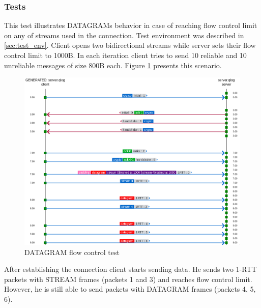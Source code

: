 \subsubsection{Tests}
This test illustrates DATAGRAMs behavior in case of reaching flow control limit on any of streams used in the connection.
Test environment was described in \ref{sec:test_env}.
Client opens two bidirectional streams while server sets their flow control limit to 1000B.
In each iteration client tries to send 10 reliable and 10 unreliable messages of size 800B each.
Figure \ref{fig:dgram_flow_control} presents this scenario.

\begin{figure}
  \centering
  \includegraphics[width=\textwidth]{img/__09__datagrams/dgram_flow_control.png}
  \caption{DATAGRAM flow control test}
  \label{fig:dgram_flow_control}
\end{figure}

After establishing the connection client starts sending data.
He sends two 1-RTT packets with STREAM frames (packets 1 and 3) and reaches flow control limit.
However, he is still able to send packets with DATAGRAM frames (packets 4, 5, 6).


